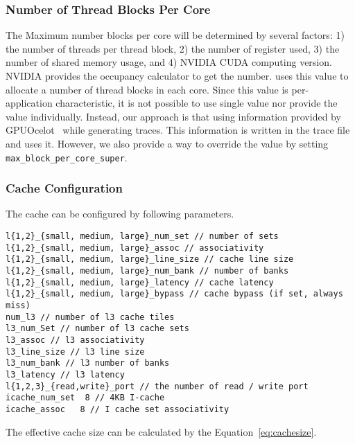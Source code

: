 \subsubsection{Number of Thread Blocks Per Core}

The Maximum number blocks per core will be determined by several
factors: 1) the number of threads per thread block, 2) the number of
register used, 3) the number of shared memory usage, and 4) NVIDIA
CUDA computing version. NVIDIA provides the occupancy calculator to
get the number. \SIM uses this value to allocate a number of thread
blocks in each core. Since this value is per-application
characteristic, it is not possible to use single value nor provide the
value individually. Instead, our approach is that using information
provided by GPUOcelot~\cite{ocelot} while generating traces. This
information is written in the trace file and \SIM uses it. However, we
also provide a way to override the value by
setting \Verb+max_block_per_core_super+.



\subsubsection{Cache Configuration}

The cache can be configured by following parameters.

\begin{Verbatim}
l{1,2}_{small, medium, large}_num_set // number of sets
l{1,2}_{small, medium, large}_assoc // associativity
l{1,2}_{small, medium, large}_line_size // cache line size
l{1,2}_{small, medium, large}_num_bank // number of banks  
l{1,2}_{small, medium, large}_latency // cache latency
l{1,2}_{small, medium, large}_bypass // cache bypass (if set, always miss)
num_l3 // number of l3 cache tiles
l3_num_Set // number of l3 cache sets
l3_assoc // l3 associativity
l3_line_size // l3 line size
l3_num_bank // l3 number of banks
l3_latency // l3 latency
l{1,2,3}_{read,write}_port // the number of read / write port
icache_num_set  8 // 4KB I-cache 
icache_assoc   8 // I cache set associativity 
\end{Verbatim}


The effective cache size can be calculated by the
Equation~\ref{eq:cachesize}.

